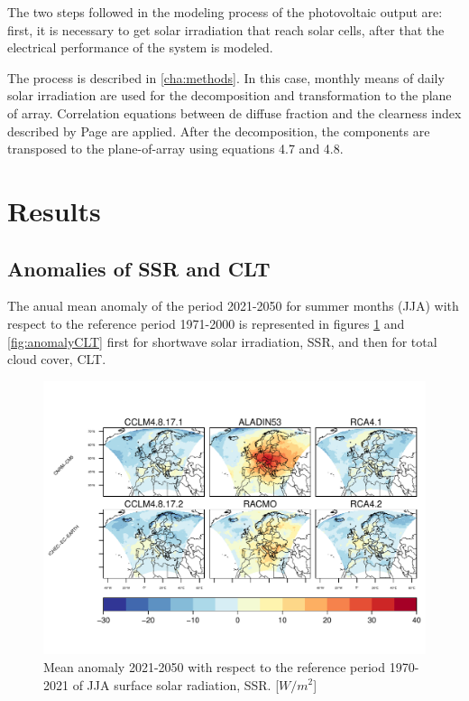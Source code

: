 The two steps followed in the modeling process of the photovoltaic output are: first, it is necessary to get solar irradiation that reach solar cells, after that the electrical performance of the system is modeled.

The process is described in \ref{cha:methods}. In this case, monthly means of daily solar irradiation are used for the decomposition and transformation to the plane of array. Correlation equations between de diffuse fraction and the clearness index described by Page are applied. After the decomposition, the components are transposed to the plane-of-array using equations 4.7 and 4.8.   

\section{Results}

\subsection{Anomalies of SSR and CLT}

The anual mean anomaly of the period 2021-2050 for summer months (JJA) with respect to the reference period 1971-2000 is represented in figures \ref{fig:anomalySSR} and \ref{fig:anomalyCLT} first for shortwave solar irradiation, SSR, and then for total cloud cover, CLT.

\begin{figure}[h]
\centering\includegraphics[width=1\textwidth]{figs/capitulo7/ANOMALIAS_JJA_SSR_2050-2021_r12.pdf}
\caption{Mean anomaly 2021-2050 with respect to the reference period 1970-2021 of JJA surface solar radiation, SSR. [$W/m^2$]}
\label{fig:anomalySSR}
\end{figure}

